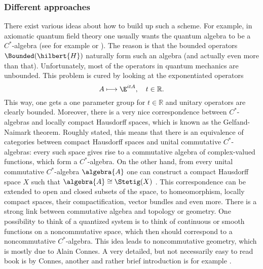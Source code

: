 \subsubsection{Different approaches}
There exist various ideas about how to build up such a scheme. For example, in 
axiomatic quantum field theory one usually wants the quantum algebra to be a 
$C^*$-algebra (see for example \cite{haag:1993a} or 
\cite{baer.ginoux.pfaeffle:2007a}). The reason is that the bounded operators 
$\Bounded(\hilbert{H})$ naturally form such an algebra (and actually even more 
than that). Unfortunately, most of the operators in quantum mechanics are 
unbounded. This problem is cured by looking at the exponentiated operators
\begin{equation*}
	A
	\longmapsto
	\E^{i t A},
	\quad t \in \mathbb{R}.
\end{equation*}
This way, one gets a one parameter group for $t \in \mathbb{R}$ and unitary 
operators are clearly bounded. Moreover, there is a very nice correspondence 
between $C^*$-algebras and locally compact Hausdorff spaces, which is known as 
the Gelfand-Naimark theorem. Roughly stated, this means that there is an 
equivalence of categories between compact Hausdorff spaces and unital commutative 
$C^*$-algebras: every such space gives rise to a commutative algebra 
of complex-valued functions, which form a $C^*$-algebra. On the other hand, from 
every unital commutative $C^*$-algebra $\algebra{A}$ one can construct a 
compact Hausdorff space $X$ such that $\algebra{A} \cong \Stetig(X)$ . This 
correspondence can be extended to open and closed subsets of the space, to 
homeomorphism, locally compact spaces, their compactification, vector bundles and 
even more. There is a strong link between commutative algebra and topology or 
geometry. One possibility to think of a quantized system is to think of continuous 
or smooth functions on a noncommutative space, which then should correspond to a 
noncommutative $C^*$-algebra. This idea leads to noncommutative geometry, which 
is mostly due to Alain Connes. A very detailed, but not necessarily easy to read 
book is \cite{connes:1994a} by Connes, another and rather brief introduction is 
for example \cite{varilly:2006a}.


